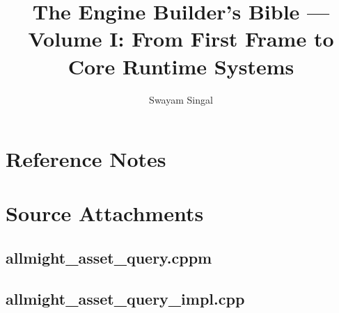 \documentclass[11pt,twoside]{book}
\title{The Engine Builder's Bible --- Volume I: From First Frame to Core Runtime Systems}
\author{Swayam Singal}
\begin{document}
\maketitle
\hypertarget{volume-reading-map}{}
\tableofcontents
\mainmatter
























\appendix
\chapter{Reference Notes}











\chapter{Source Attachments}
\hypertarget{source-file-453ba365bb56ed2f6e4c3f8e}{}
\section*{allmight\_asset\_query.cppm}
\hypertarget{source-file-26fa02737266a08f013cdbb5}{}
\section*{allmight\_asset\_query\_impl.cpp}
\hypertarget{source-file-b84757ff09b490e82f7f98ea}{}
\end{document}
